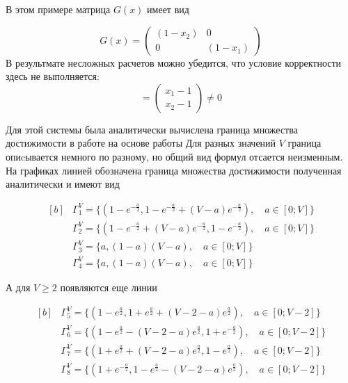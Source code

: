 \documentclass[a4paper,12pt]{article}
\begin{document}
В этом примере матрица $G(x)$ имеет вид 

\begin{equation*}
  G(x) = 
  \begin{pmatrix}
    (1-x_2) & 0 \\
    0 & (1-x_1)
  \end{pmatrix}
\end{equation*}
В результмате несложных расчетов можно убедится, что условие корректности здесь не выполняется:
\begin{equation*}
  [\varphi,\psi] = 
  \begin{pmatrix}
    x_1 - 1\\
    x_2 - 1
  \end{pmatrix}
  \neq 0
\end{equation*}


Для этой системы была аналитически вычислена граница множества
достижимости в работе на основе работы \cite{AVS2016} Для разных
значений $V$ граница опиcывается немного по разному, но общий вид
формул отсается неизменным. На графиках линией обозначена граница
множества достижимости полученная аналитически и имеют вид

\begin{equation*}
  \begin{aligned}[b]
    &\Gamma^V_1 = \{ (1 - e^{-\frac{a}{2}},1 -
    e^{-\frac{a}{2}}+(V-a)e^{-\frac{a}{2}}), \quad a\in[0;V] \}\\
    &\Gamma^V_2 = \{ (1 -
    e^{-\frac{a}{2}}+(V-a)e^{-\frac{a}{2}},1 - e^{-\frac{a}{2}}),\quad
    a\in[0;V] \}\\
    &\Gamma^V_3 = \{a,(1-a)(V-a), \quad a\in[0;V] \}\\
    &\Gamma^V_4 = \{a,(1-a)(V-a), \quad a\in[0;V] \}
  \end{aligned}
\end{equation*}

А для $V \ge 2$ появляются еще линии

\begin{equation*}
  \begin{aligned}[b]
    &\Gamma^V_5 = \{ (1 - e^{\frac{a}{2}},1 +
    e^{\frac{a}{2}}+(V-2-a)e^{\frac{a}{2}}), \quad a\in[0;V-2]  \}\\
    &\Gamma^V_6 = \{ (1 -
    e^{\frac{a}{2}}-(V-2-a)e^{\frac{a}{2}},1 + e^{-\frac{a}{2}}), \quad a\in[0;V-2] \}\\
    &\Gamma^V_7 = \{ (1 +
    e^{\frac{a}{2}}+(V-2-a)e^{\frac{a}{2}},1 - e^{\frac{a}{2}}), \quad a\in[0;V-2] \}\\
    &\Gamma^V_8 = \{ (1 + e^{-\frac{a}{2}},1 -
    e^{\frac{a}{2}}-(V-2-a)e^{\frac{a}{2}}), \quad a\in[0;V-2] \}\\
  \end{aligned}
\end{equation*}
\end{document}
